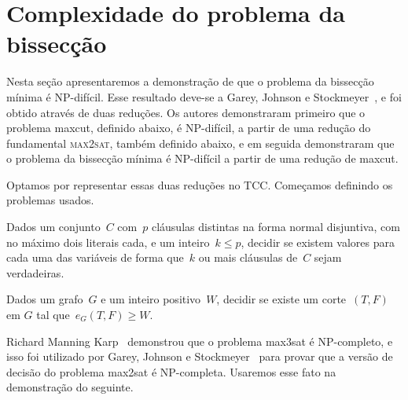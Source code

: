 \section {Complexidade do problema da bissecção}

	Nesta seção apresentaremos a demonstração de que o problema 
	da bissecção mínima é NP-difícil.
	Esse resultado deve-se a Garey, Johnson e Stockmeyer~\cite{GareyJS76},
	e foi obtido através de duas reduções.
	Os autores demonstraram primeiro que o problema {\sc maxcut},
	definido abaixo, é NP-difícil, a partir de uma redução do
	fundamental \textsc {max2sat}, também definido abaixo, e em seguida
	demonstraram que o problema da bissecção mínima é NP-difícil
	a partir de uma redução de {\sc maxcut}.

	Optamos por representar essas duas reduções no TCC.
	Começamos definindo os problemas usados.



	\medskip

	\begin{prob}
		Dados um conjunto~$C$ com~$p$ cláusulas distintas na forma 
		normal disjuntiva, com no máximo
		dois literais cada, e um inteiro~$k\le p$,
		decidir se existem valores para cada uma das variáveis de forma
		que~$k$ ou mais cláusulas de~$C$ sejam verdadeiras.

	\end{prob}

	\medskip

	\begin{prob}
		Dados um grafo~${G}$
		e um inteiro positivo~${W}$, decidir se existe um
		corte~$(T,F)$ em $G$ tal 
		que~${e_G(T,F)\ge W}$.
		
	\end{prob}


	Richard Manning Karp~\cite{Kar72} demonstrou que o problema 
	{\sc max3sat} é NP-completo,
	e isso foi utilizado por Garey, 
	Johnson e Stockmeyer~\cite{GareyJS76} 
	para provar que a versão de decisão
	do problema {\sc max2sat} é NP-completa.
	Usaremos esse fato na demonstração do seguinte.



